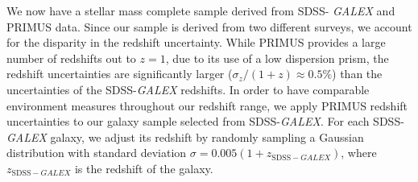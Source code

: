 \documentclass{emulateapj}
\begin{document}
We now have a stellar mass complete sample derived from SDSS-{\em
  GALEX} and PRIMUS data. Since our sample is derived from two
different surveys, we account for the disparity in the redshift
uncertainty. While PRIMUS provides a large number of redshifts out to
$z = 1$, due to its use of a low dispersion prism, the redshift
uncertainties are significantly larger ($\sigma_{z}/(1+z) \approx 0.5
\%$) than the uncertainties of the SDSS-{\em GALEX} redshifts. In order to have
comparable environment measures throughout our redshift range, we
apply PRIMUS redshift uncertainties to our galaxy sample selected from
SDSS-{\em GALEX}. For each SDSS-{\em GALEX} galaxy, we adjust its
redshift by randomly sampling a Gaussian distribution with standard
deviation $\sigma = 0.005 (1+z_{\mathrm{SDSS}-GALEX})$, where
$z_{\mathrm{SDSS}-GALEX}$ is the redshift of the galaxy.

\end{document}
